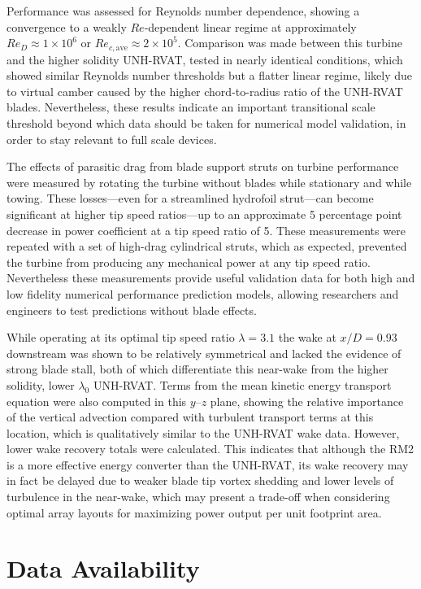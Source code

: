\documentclass[10pt,letterpaper]{article}
\begin{document}
Performance was assessed for Reynolds number dependence, showing a convergence
to a weakly $Re$-dependent linear regime at approximately $Re_D \approx 1 \times
10^6$ or $Re_{c,\mathrm{ave}} \approx 2 \times 10^5$. Comparison was made
between this turbine and the higher solidity UNH-RVAT, tested in nearly
identical conditions, which showed similar Reynolds number thresholds but a
flatter linear regime, likely due to virtual camber caused by the higher
chord-to-radius ratio of the UNH-RVAT blades. Nevertheless, these results
indicate an important transitional scale threshold beyond which data should be
taken for numerical model validation, in order to stay relevant to full scale
devices.

The effects of parasitic drag from blade support struts on turbine performance
were measured by rotating the turbine without blades while stationary and while
towing. These losses---even for a streamlined hydrofoil strut---can become
significant at higher tip speed ratios---up to an approximate 5 percentage point
decrease in power coefficient at a tip speed ratio of 5. These measurements were
repeated with a set of high-drag cylindrical struts, which as expected,
prevented the turbine from producing any mechanical power at any tip speed
ratio. Nevertheless these measurements provide useful validation data for both
high and low fidelity numerical performance prediction models, allowing
researchers and engineers to test predictions without blade effects.

While operating at its optimal tip speed ratio $\lambda=3.1$ the wake at
$x/D=0.93$ downstream was shown to be relatively symmetrical and lacked the
evidence of strong blade stall, both of which differentiate this near-wake from
the higher solidity, lower $\lambda_0$ UNH-RVAT. Terms from the mean kinetic
energy transport equation were also computed in this $y$--$z$ plane, showing the
relative importance of the vertical advection compared with turbulent transport
terms at this location, which is qualitatively similar to the UNH-RVAT wake
data. However, lower wake recovery totals were calculated. This indicates that
although the RM2 is a more effective energy converter than the UNH-RVAT, its
wake recovery may in fact be delayed due to weaker blade tip vortex shedding and
lower levels of turbulence in the near-wake, which may present a trade-off when
considering optimal array layouts for maximizing power output per unit footprint
area.


\section*{Data Availability}
\end{document}
